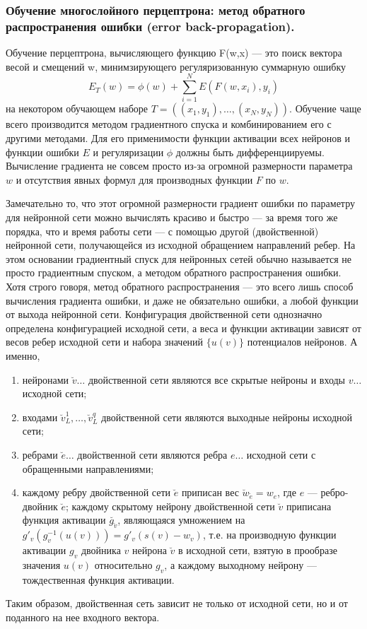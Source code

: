 \subsubsection{Обучение многослойного перцептрона: метод обратного распространения ошибки (error back-propagation).}
Обучение перцептрона, вычисляющего функцию F(w,x) --- это поиск вектора весой и
смещений w, минимзирующего регуляризованную суммарную ошибку
\[ E_T(w) = \phi(w) + \sum_{i=1}^NE(F(w,x_i),y_i) \]
на некотором обучающем наборе $T = ((x_1,y_1),\dots,(x_N,y_N))$. Обучение чаще
всего производится методом градиентного спуска и комбинированием его с другими
методами. Для его применимости функции активации всех нейронов и функции ошибки
$E$ и регуляризации $\phi$ должны быть дифференциируемы. Вычисление градиента не
совсем просто из-за огромной размерности параметра $w$ и отсутствия явных формул
для производных функции $F$ по $w$.


Замечательно то, что этот огромной размерности градиент ошибки по параметру для
нейронной сети можно вычислять красиво и быстро — за время того же порядка, что
и время работы сети — с помощью другой (двойственной) нейронной сети,
получающейся из исходной обращением направлений ребер. На этом основании
градиентный спуск для нейронных сетей обычно называется не просто градиентным
спуском, а методом обратного распространения ошибки. Хотя строго говоря, метод
обратного распространения — это всего лишь способ вычисления градиента ошибки, и
даже не обязательно ошибки, а любой функции от выхода нейронной
сети. Конфигурация двойственной сети однозначно определена конфигурацией
исходной сети, а веса и функции активации зависят от весов ребер исходной сети и
набора значений $\{u(v)\}$ потенциалов нейронов. А именно,
\begin{enumerate}
\item нейронами $\breve{v}\dots$ двойственной сети являются все скрытые нейроны
и входы $v\dots$ исходной сети;
\item входами $\breve{v}_L^1,\dots,\breve{v}_L^q$ двойственной сети являются
выходные нейроны исходной сети;
\item ребрами $\breve{e}\dots$ двойственной сети являются ребра $e\dots$
исходной сети с обращенными направлениями;
\item каждому ребру двойственной сети $\breve{e}$ приписан вес
$\breve{w}_{\breve{e}} = w_e$, где $e$ --- ребро-двойник $\breve{e}$; каждому
скрытому нейрону двойственной сети $\breve{v}$ приписана функция активации
$\breve{g_{\breve{v}}}$, являющаяся умножением на $g'_v(g_v^{-1}(u(v))) =
g'_v(s(v) - w_v)$, т.е. на производную функции активации $g_v$ двойника $v$
нейрона $\breve{v}$ в исходной сети, взятую в прообразе значения $u(v)$
относительно $g_v$, а каждому выходному нейрону --- тождественная функция
активации.
\end{enumerate} Таким образом, двойственная сеть зависит не только от исходной
сети, но и от поданного на нее входного вектора.

